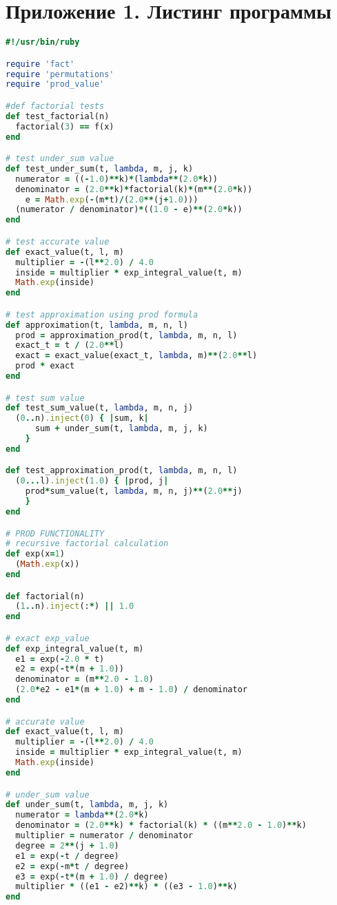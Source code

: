 \documentclass [12pt]{report}
\begin{document}
\chapter*{Приложение 1. Листинг программы}

\begin{lstlisting}[language=Ruby]
#!/usr/bin/ruby

require 'fact'
require 'permutations'
require 'prod_value'

#def factorial tests
def test_factorial(n)
  factorial(3) == f(x)
end

# test under_sum value
def test_under_sum(t, lambda, m, j, k)
  numerator = ((-1.0)**k)*(lambda**(2.0*k))
  denominator = (2.0**k)*factorial(k)*(m**(2.0*k))
	e = Math.exp(-(m*t)/(2.0**(j+1.0)))
  (numerator / denominator)*((1.0 - e)**(2.0*k))
end

# test accurate value
def exact_value(t, l, m)
  multiplier = -(l**2.0) / 4.0
  inside = multiplier * exp_integral_value(t, m)
  Math.exp(inside)
end

# test approximation using prod formula
def approximation(t, lambda, m, n, l)
  prod = approximation_prod(t, lambda, m, n, l)
  exact_t = t / (2.0**l)
  exact = exact_value(exact_t, lambda, m)**(2.0**l)
  prod * exact
end

# test sum value
def test_sum_value(t, lambda, m, n, j)
  (0..n).inject(0) { |sum, k|
	  sum + under_sum(t, lambda, m, j, k)
	}
end

def test_approximation_prod(t, lambda, m, n, l)
  (0...l).inject(1.0) { |prod, j|
	prod*sum_value(t, lambda, m, n, j)**(2.0**j)
	}
end

# PROD FUNCTIONALITY
# recursive factorial calculation
def exp(x=1)
  (Math.exp(x))
end

def factorial(n)
  (1..n).inject(:*) || 1.0
end

# exact exp_value
def exp_integral_value(t, m)
  e1 = exp(-2.0 * t)
  e2 = exp(-t*(m + 1.0))
  denominator = (m**2.0 - 1.0)
  (2.0*e2 - e1*(m + 1.0) + m - 1.0) / denominator
end

# accurate value
def exact_value(t, l, m)
  multiplier = -(l**2.0) / 4.0
  inside = multiplier * exp_integral_value(t, m)
  Math.exp(inside)
end

# under_sum value
def under_sum(t, lambda, m, j, k)
  numerator = lambda**(2.0*k)
  denominator = (2.0**k) * factorial(k) * ((m**2.0 - 1.0)**k)
  multiplier = numerator / denominator
  degree = 2**(j + 1.0)
  e1 = exp(-t / degree)
  e2 = exp(-m*t / degree)
  e3 = exp(-t*(m + 1.0) / degree)
  multiplier * ((e1 - e2)**k) * ((e3 - 1.0)**k)
end


\end{lstlisting}
\end{document}

